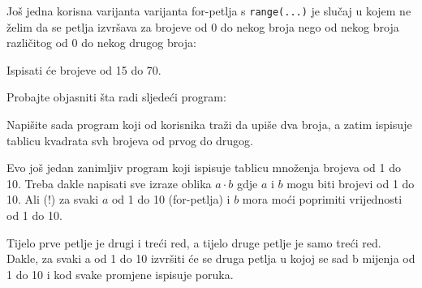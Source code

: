 Jo\v{s} jedna korisna varijanta varijanta for-petlja s \verb"range(...)" je
slu\v{c}aj u kojem ne \v{z}elim da se petlja izvr\v{s}ava za brojeve od 0 do nekog
broja nego od nekog broja razli\v{c}itog od 0 do nekog drugog broja:


Ispisati \'{c}e brojeve od 15 do 70.

Probajte objasniti \v{s}ta radi sljede\'{c}i program:


Napi\v{s}ite sada program koji od korisnika tra\v{z}i da upi\v{s}e dva broja, a
zatim ispisuje tablicu kvadrata svh brojeva od prvog do drugog.

Evo jo\v{s} jedan zanimljiv program koji ispisuje tablicu mno\v{z}enja brojeva od
1 do 10. Treba dakle napisati sve izraze oblika $a\cdot b$ gdje $a$ i $b$
mogu biti brojevi od 1 do 10. Ali (!) za svaki $a$ od 1 do 10 (for-petlja)
i $b$ mora mo\'{c}i poprimiti vrijednosti od 1 do 10.


Tijelo prve petlje je drugi i tre\'{c}i red, a tijelo druge petlje je samo
tre\'{c}i red. Dakle, za svaki a od 1 do 10 izvr\v{s}iti \'{c}e se druga petlja u
kojoj se sad b mijenja od 1 do 10 i kod svake promjene ispisuje poruka.

